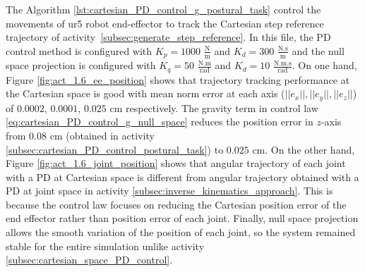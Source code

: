 The Algorithm \ref{lst:cartesian_PD_control_g_postural_task} control the movements of ur5 robot end-effector to track the Cartesian step reference trajectory of activity~\ref{subsec:generate_step_reference}. In this file, the PD control method is configured with ${K_{p}}=1000$ $\mathrm{\frac{N}{m}}$ and $K_{d}= 300$ $\mathrm{\frac{N.s}{m}}$ and the null space projection is configured with ${K_{q}}=50$ $\mathrm{\frac{N.m}{rad}}$ and $K_{d}= 10$ $\mathrm{\frac{N.m.s}{rad}}$. On one hand, Figure \ref{fig:act_1.6_ee_position} shows that trajectory tracking performance at the Cartesian space is good with mean norm error at each axis ($||e_x||, ||e_y||, ||e_z||$) of $0.0002$, $0.0001$, $0.025$ cm respectively. The gravity term in control law \eqref{eq:cartesian_PD_control_g_null_space} reduces the position error in $z$-axis from $0.08$ cm (obtained in activity \ref{subsec:cartesian_PD_control_postural_task}) to $0.025$ cm. On the other hand, Figure \ref{fig:act_1.6_joint_position} shows that angular trajectory of each joint with a PD at Cartesian space is different from angular trajectory obtained with a PD at joint space in activity \ref{subsec:inverse_kinematics_approach}. This is because the control law focuses on reducing the Cartesian position error of the end effector rather than position error of each joint. Finally, null space projection allows the smooth variation of the position of each joint, so the system remained stable for the entire simulation unlike activity \ref{subsec:cartesian_space_PD_control}. \vspace{.5cm}

